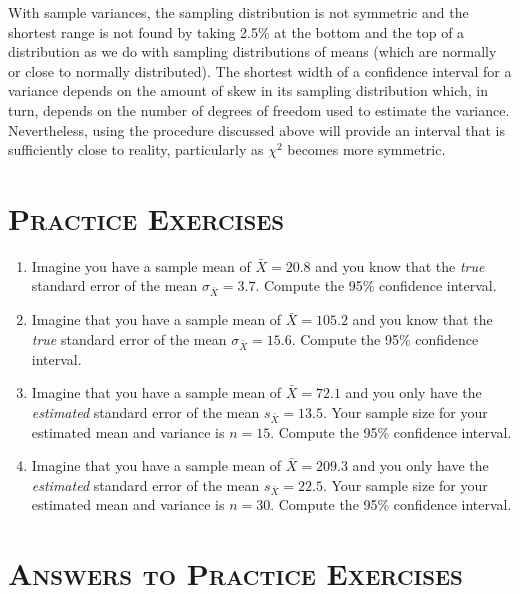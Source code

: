 \documentclass[12pt]{article}
\begin{document}
With sample variances, the sampling distribution is not symmetric and the shortest range is not found by taking 2.5\% at the bottom and the top of a distribution as we do with sampling distributions of means (which are normally or close to normally distributed). The shortest width of a confidence interval for a variance depends on the amount of skew in its sampling distribution which, in turn, depends on the number of degrees of freedom used to estimate the variance. Nevertheless, using the procedure discussed above will provide an interval that is sufficiently close to reality, particularly as $\chi^2$ becomes more symmetric.

\newpage


\section*{\textsc{Practice Exercises}}

\begin{enumerate}
\item Imagine you have a sample mean of $\bar{X}=20.8$ and you know that the \textit{true} standard error of the mean $\sigma_{\bar{X}}=3.7$. Compute the 95\% confidence interval.

\item Imagine that you have a sample mean of $\bar{X}=105.2$ and you know that the \textit{true} standard error of the mean $\sigma_{\bar{X}}=15.6$. Compute the 95\% confidence interval.

\item Imagine that you have a sample mean of $\bar{X}=72.1$ and you only have the \textit{estimated} standard error of the mean $s_{\bar{X}}=13.5$. Your sample size for your estimated mean and variance is $n=15$. Compute the 95\% confidence interval.

\item Imagine that you have a sample mean of $\bar{X}=209.3$ and you only have the \textit{estimated} standard error of the mean $s_{\bar{X}}=22.5$. Your sample size for your estimated mean and variance is $n=30$. Compute the 95\% confidence interval.
\end{enumerate}

\newpage


\section*{\textsc{Answers to Practice Exercises}}
\end{document}
